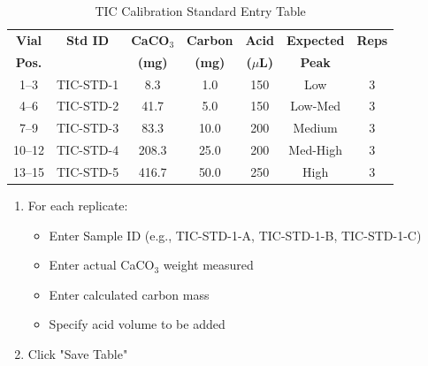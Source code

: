 \documentclass[11pt,a4paper]{article}\usepackage[]{graphicx}\usepackage[]{xcolor}
\begin{document}
\begin{table}[h]
\centering
\scriptsize
\begin{tabular}{ccccccc}
\toprule
\textbf{Vial} & \textbf{Std ID} & \textbf{CaCO$_3$} & \textbf{Carbon} & \textbf{Acid} & \textbf{Expected} & \textbf{Reps} \\
\textbf{Pos.} & & \textbf{(mg)} & \textbf{(mg)} & \textbf{($\mu$L)} & \textbf{Peak} & \\
\midrule
1--3 & TIC-STD-1 & 8.3 & 1.0 & 150 & Low & 3 \\
4--6 & TIC-STD-2 & 41.7 & 5.0 & 150 & Low-Med & 3 \\
7--9 & TIC-STD-3 & 83.3 & 10.0 & 200 & Medium & 3 \\
10--12 & TIC-STD-4 & 208.3 & 25.0 & 200 & Med-High & 3 \\
13--15 & TIC-STD-5 & 416.7 & 50.0 & 250 & High & 3 \\
\bottomrule
\end{tabular}
\caption{TIC Calibration Standard Entry Table}
\end{table}

\begin{enumerate}[noitemsep]
    \item For each replicate:
    \begin{itemize}
        \item Enter Sample ID (e.g., TIC-STD-1-A, TIC-STD-1-B, TIC-STD-1-C)
        \item Enter actual CaCO$_3$ weight measured
        \item Enter calculated carbon mass
        \item Specify acid volume to be added
    \end{itemize}
    \item Click "Save Table"
\end{enumerate}
\end{document}
